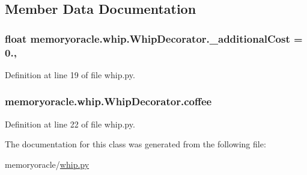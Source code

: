 \subsection{Member Data Documentation}
\hypertarget{classmemoryoracle_1_1whip_1_1WhipDecorator_ac4e118473ef05bf2a6f2767711f1101d}{}
\subsubsection[{\+\_\+additional\+Cost}]{\setlength{\rightskip}{0pt plus 5cm}float memoryoracle.\+whip.\+Whip\+Decorator.\+\_\+additional\+Cost = 0.\hspace{0.3cm}{\ttfamily [static]}, {\ttfamily [private]}}\label{classmemoryoracle_1_1whip_1_1WhipDecorator_ac4e118473ef05bf2a6f2767711f1101d}


Definition at line 19 of file whip.\+py.

\hypertarget{classmemoryoracle_1_1whip_1_1WhipDecorator_a15614e10c214e40622bf7d2feaa54673}{}
\subsubsection[{coffee}]{\setlength{\rightskip}{0pt plus 5cm}memoryoracle.\+whip.\+Whip\+Decorator.\+coffee}\label{classmemoryoracle_1_1whip_1_1WhipDecorator_a15614e10c214e40622bf7d2feaa54673}


Definition at line 22 of file whip.\+py.



The documentation for this class was generated from the following file\+:\begin{DoxyCompactItemize}
\item 
memoryoracle/\hyperlink{whip_8py}{whip.\+py}\end{DoxyCompactItemize}

